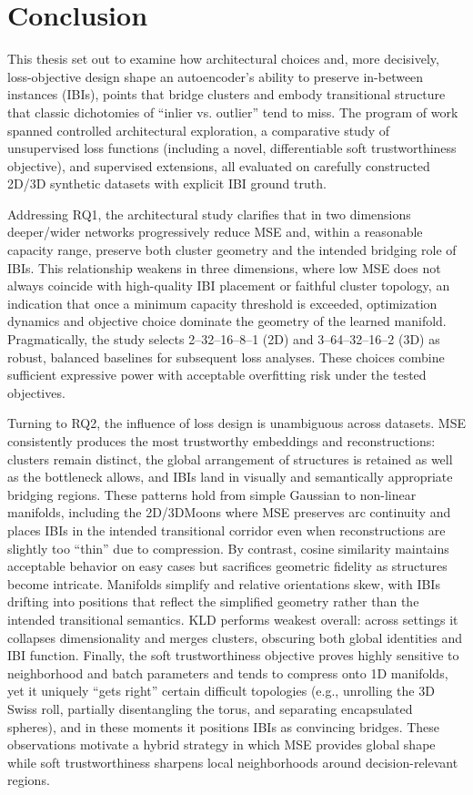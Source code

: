 \chapter{Conclusion} \label{ch:conclusion}

This thesis set out to examine how architectural choices and, more decisively, loss-objective design shape an autoencoder’s ability to preserve in-between instances (IBIs), points that bridge clusters and embody transitional structure that classic dichotomies of “inlier vs. outlier” tend to miss. The program of work spanned controlled architectural exploration, a comparative study of unsupervised loss functions (including a novel, differentiable soft trustworthiness objective), and supervised extensions, all evaluated on carefully constructed 2D/3D synthetic datasets with explicit IBI ground truth.

Addressing RQ1, the architectural study clarifies that in two dimensions deeper/wider networks progressively reduce MSE and, within a reasonable capacity range, preserve both cluster geometry and the intended bridging role of IBIs. This relationship weakens in three dimensions, where low MSE does not always coincide with high-quality IBI placement or faithful cluster topology, an indication that once a minimum capacity threshold is exceeded, optimization dynamics and objective choice dominate the geometry of the learned manifold. Pragmatically, the study selects 2–32–16–8–1 (2D) and 3–64–32–16–2 (3D) as robust, balanced baselines for subsequent loss analyses. These choices combine sufficient expressive power with acceptable overfitting risk under the tested objectives.

Turning to RQ2, the influence of loss design is unambiguous across datasets. MSE consistently produces the most trustworthy embeddings and reconstructions: clusters remain distinct, the global arrangement of structures is retained as well as the bottleneck allows, and IBIs land in visually and semantically appropriate bridging regions. These patterns hold from simple Gaussian to non-linear manifolds, including the 2D/3DMoons where MSE preserves arc continuity and places IBIs in the intended transitional corridor even when reconstructions are slightly too “thin” due to compression. By contrast, cosine similarity maintains acceptable behavior on easy cases but sacrifices geometric fidelity as structures become intricate. Manifolds simplify and relative orientations skew, with IBIs drifting into positions that reflect the simplified geometry rather than the intended transitional semantics. KLD performs weakest overall: across settings it collapses dimensionality and merges clusters, obscuring both global identities and IBI function. Finally, the soft trustworthiness objective proves highly sensitive to neighborhood and batch parameters and tends to compress onto 1D manifolds, yet it uniquely “gets right” certain difficult topologies (e.g., unrolling the 3D Swiss roll, partially disentangling the torus, and separating encapsulated spheres), and in these moments it positions IBIs as convincing bridges. These observations motivate a hybrid strategy in which MSE provides global shape while soft trustworthiness sharpens local neighborhoods around decision-relevant regions.

